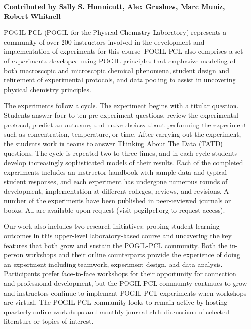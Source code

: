 \textbf{Contributed by Sally S. Hunnicutt, Alex Grushow, Marc Muniz, Robert Whitnell}

POGIL-PCL (POGIL for the Physical Chemistry Laboratory) represents a community of over 200 instructors involved in the development and implementation of experiments for this course. POGIL-PCL also comprises a set of experiments developed using POGIL principles that emphasize modeling of both macroscopic and microscopic chemical phenomena, student design and refinement of experimental protocols, and data pooling to assist in uncovering physical chemistry principles. 

The experiments follow a cycle. The experiment begins with a titular question. Students answer four to ten pre-experiment questions, review the experimental protocol, predict an outcome, and make choices about performing the experiment such as concentration, temperature, or time. After carrying out the experiment, the students work in teams to answer Thinking About The Data (TATD) questions. The cycle is repeated two to three times, and in each cycle students develop increasingly sophisticated models of their results. Each of the completed experiments includes an instructor handbook with sample data and typical student responses, and each experiment has undergone numerous rounds of development, implementation at different colleges, reviews, and revisions. A number of the experiments have been published in peer-reviewed journals or books. All are available upon request (visit pogilpcl.org to request access).

Our work also includes two research initiatives: probing student learning outcomes in this upper-level laboratory-based course and uncovering the key features that both grow and sustain the POGIL-PCL community. Both the in-person workshops and their online counterparts provide the experience of doing an experiment including teamwork, experiment design, and data analysis. Participants prefer face-to-face workshops for their opportunity for connection and professional development, but the POGIL-PCL community continues to grow and instructors continue to implement POGIL-PCL experiments when workshops are virtual. The POGIL-PCL community looks to remain active by hosting quarterly online workshops and monthly journal club discussions of selected literature or topics of interest.